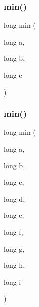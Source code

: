 \mbox{\label{adat-devel_2lib_2SU3_2misc_8cc_aefc0eafc9721ef9630421dcc1358b8e9}} 
\subsubsection{\texorpdfstring{min()}{min()}\hspace{0.1cm}{\footnotesize\ttfamily [2/3]}}
{\footnotesize\ttfamily long min (\begin{DoxyParamCaption}\item[{long}]{a,  }\item[{long}]{b,  }\item[{long}]{c }\end{DoxyParamCaption})}

\mbox{\label{adat-devel_2lib_2SU3_2misc_8cc_a7b867e861e5689e3621835875d963e2d}} 
\subsubsection{\texorpdfstring{min()}{min()}\hspace{0.1cm}{\footnotesize\ttfamily [3/3]}}
{\footnotesize\ttfamily long min (\begin{DoxyParamCaption}\item[{long}]{a,  }\item[{long}]{b,  }\item[{long}]{c,  }\item[{long}]{d,  }\item[{long}]{e,  }\item[{long}]{f,  }\item[{long}]{g,  }\item[{long}]{h,  }\item[{long}]{i }\end{DoxyParamCaption})}


